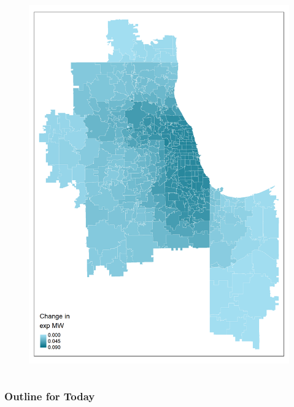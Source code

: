 \documentclass[aspectratio=169, t]{beamer}
\begin{document}
\begin{frame}[label = chi_example]
\begin{columns}
\begin{column}{0.50\textwidth}
\begin{figure}
                \includegraphics[scale = 0.36]{maps_events/output/chicago2019-6_exp_mw.png}
            \end{figure}   
        \end{column}
    \end{columns}
    \hspace{6mm}
    \hyperlink{nyc_example}{}    
    \hyperlink{seattle_example}{}
    \hyperlink{bay_example}{}
    \hyperlink{san_diego_example}{}
    \hyperlink{kc_example}{}
\end{frame}

\begin{frame}
	\frametitle{Outline for Today}
	\tableofcontents[hideallsubsections]
\end{frame}
\end{document}
